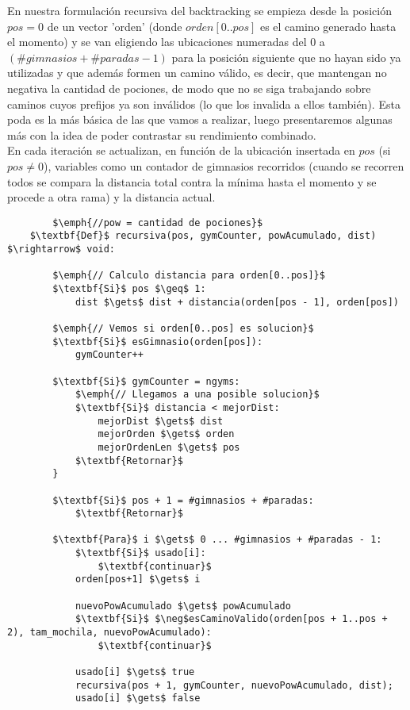     En nuestra formulación recursiva del backtracking se empieza desde la posición $pos = 0$ de un vector 'orden' (donde $orden[0..pos]$ es el camino generado hasta el momento) y se van eligiendo las ubicaciones numeradas del 0 a $(\#gimnasios + \#paradas - 1)$ para la posición siguiente que no hayan sido ya utilizadas y que además formen un camino válido, es decir, que mantengan no negativa la cantidad de pociones, de modo que no se siga trabajando sobre caminos cuyos prefijos ya son inválidos (lo que los invalida a ellos también). Esta poda es la más básica de las que vamos a realizar, luego presentaremos algunas más con la idea de poder contrastar su rendimiento combinado.
    \\

    En cada iteración se actualizan, en función de la ubicación insertada en $pos$ (si $pos \neq 0$), variables como un contador de gimnasios recorridos (cuando se recorren todos se compara la distancia total contra la mínima hasta el momento y se procede a otra rama) y la distancia actual.
    \newpage

    \begin{lstlisting}
        $\emph{//pow = cantidad de pociones}$
    $\textbf{Def}$ recursiva(pos, gymCounter, powAcumulado, dist) $\rightarrow$ void:

        $\emph{// Calculo distancia para orden[0..pos]}$
        $\textbf{Si}$ pos $\geq$ 1:
            dist $\gets$ dist + distancia(orden[pos - 1], orden[pos])

        $\emph{// Vemos si orden[0..pos] es solucion}$
        $\textbf{Si}$ esGimnasio(orden[pos]):
            gymCounter++

        $\textbf{Si}$ gymCounter = ngyms:
            $\emph{// Llegamos a una posible solucion}$
            $\textbf{Si}$ distancia < mejorDist:
                mejorDist $\gets$ dist
                mejorOrden $\gets$ orden
                mejorOrdenLen $\gets$ pos
            $\textbf{Retornar}$
        }

        $\textbf{Si}$ pos + 1 = #gimnasios + #paradas:
            $\textbf{Retornar}$

        $\textbf{Para}$ i $\gets$ 0 ... #gimnasios + #paradas - 1:
            $\textbf{Si}$ usado[i]:
                $\textbf{continuar}$
            orden[pos+1] $\gets$ i

            nuevoPowAcumulado $\gets$ powAcumulado
            $\textbf{Si}$ $\neg$esCaminoValido(orden[pos + 1..pos + 2), tam_mochila, nuevoPowAcumulado):
                $\textbf{continuar}$

            usado[i] $\gets$ true
            recursiva(pos + 1, gymCounter, nuevoPowAcumulado, dist);
            usado[i] $\gets$ false
    \end{lstlisting}


